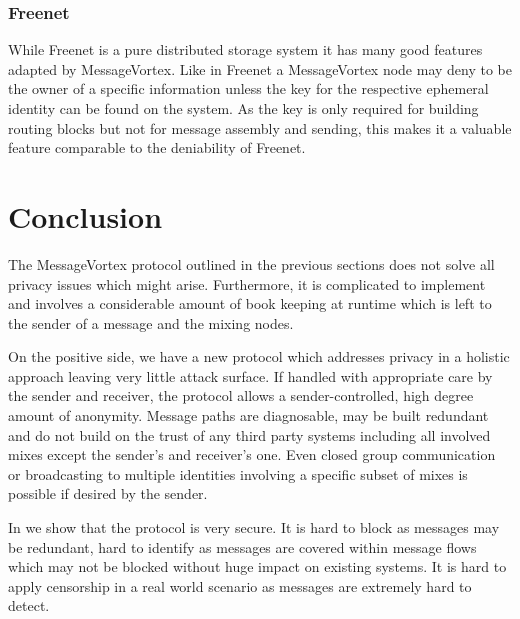 \documentclass[9pt,journal,compsoc]{IEEEtran}
\begin{document}
\subsubsection{Freenet}
%
While Freenet is a pure distributed storage system it has many good features adapted by MessageVortex. Like in Freenet a MessageVortex node may deny to be the owner of a specific information unless the key for the respective ephemeral identity can be found on the system. As the key is only required for building routing blocks but not for message assembly and sending, this makes it a valuable feature comparable to the deniability of Freenet.

\section{Conclusion}
The MessageVortex protocol outlined in the previous sections does not solve all privacy issues which might arise. Furthermore, it is complicated to implement and involves a considerable amount of book keeping at runtime which is left to the sender of a message and the mixing nodes. 

On the positive side, we have a new protocol which addresses privacy in a holistic approach leaving very little attack surface. If handled with appropriate care by the sender and receiver, the protocol allows a sender-controlled, high degree amount of anonymity. Message paths are diagnosable, may be built redundant and do not build on the trust of any third party systems including all involved mixes except the sender's and receiver's one. Even closed group communication or broadcasting to multiple identities involving a specific subset of mixes is possible if desired by the sender.

In \cite{messageVortex} we show that the protocol is very secure. It is hard to block as messages may be redundant, hard to identify as messages are covered within message flows which may not be blocked without huge impact on existing systems. It is hard to apply censorship in a real world scenario as messages are extremely hard to detect. 
\end{document}
